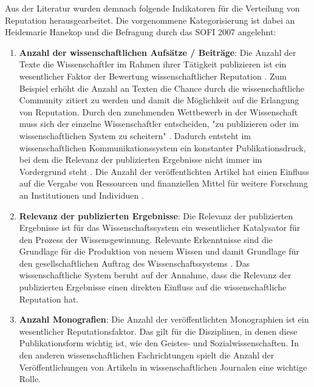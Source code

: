 Aus der Literatur wurden demnach folgende Indikatoren für die Verteilung von Reputation herausgearbeitet. Die vorgenommene Kategorisierung ist dabei an Heidemarie Hanekop \cite{hanekop_2008} und die Befragung durch das SOFI 2007 \cite{Hanekop_Wittke_2007_Fragebogen} angelehnt:
\begin{enumerate}
\item \textbf{Anzahl der wissenschaftlichen Aufsätze / Beiträge}: Die Anzahl der Texte die Wissenschaftler im Rahmen ihrer Tätigkeit publizieren ist ein wesentlicher Faktor der Bewertung wissenschaftlicher Reputation \cite{Warnke_2012} \cite{CLAPHAM_2005} \cite{luhmann_1970_selbststeuerung}. Zum Beispiel erhöht die Anzahl an Texten die Chance durch die wissenschaftliche Community zitiert zu werden und damit die Möglichkeit auf die Erlangung von Reputation. Durch den zunehmenden Wettbewerb in der Wissenschaft muss sich der einzelne Wissenschaftler entscheiden, "zu publizieren oder im wissenschaftlichen System zu scheitern" \cite{Suess_2006}. Dadurch entsteht im wissenschaftlichen Kommunikationssystem ein konstanter Publikationsdruck, bei dem die Relevanz der publizierten Ergebnisse nicht immer im Vordergrund steht \cite{hamilton_1990_publishing}. Die Anzahl der veröffentlichten Artikel hat einen Einfluss auf die Vergabe von Ressourcen und finanziellen Mittel für weitere Forschung an Institutionen und Individuen \cite{Warnke_2012} \cite{hamilton_1990_publishing}.
\item \textbf{Relevanz der publizierten Ergebnisse}: Die Relevanz der publizierten Ergebnisse ist für das Wissenschaftssystem ein wesentlicher Katalysator für den Prozess der Wissensgewinnung. Relevante Erkenntnisse sind die Grundlage für die Produktion von neuem Wissen und damit Grundlage für den gesellschaftlichen Auftrag des Wissenschaftssystems \cite{hanekop_2008}. Das wissenschaftliche System beruht auf der Annahme, dass die Relevanz der publizierten Ergebnisse einen direkten Einfluss auf die wissenschaftliche Reputation hat.
\item \textbf{Anzahl Monografien}: Die Anzahl der veröffentlichten Monographien ist ein wesentlicher Reputationsfaktor. Das gilt für die Disziplinen, in denen diese Publikationsform wichtig ist, wie den Geistes- und Sozialwissenschaften. In den anderen wissenschaftlichen Fachrichtungen spielt die Anzahl der Veröffentlichungen von Artikeln in wissenschaftlichen Journalen eine wichtige Rolle.

\end{enumerate}
